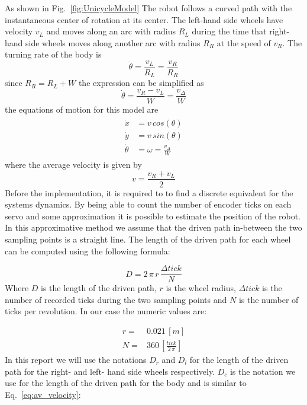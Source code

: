 As shown in Fig.~\ref{fig:UnicycleModel} The robot follows a curved path with the instantaneous center of rotation at its center.
The left-hand side wheels have velocity $v_L$ and moves along an arc with radius $R_L$ during the time that right-hand side wheels moves along another arc with radius $R_R$ at the speed of $v_R$.
The turning rate of the body is
\begin{equation*}
\dot{\theta}= \frac{v_L}{R_L} = \frac{v_R}{R_R}
\end{equation*}
since $R_R = R_L + W$ the expression can be simplified as
\begin{equation}
\dot{\theta}= \frac{v_R - v_L}{W} = \frac{v_\Delta}{W}\label{eq:ThetaDot}
\end{equation}
the equations of motion for this model are
\begin{eqnarray}
\begin{aligned}
\dot{x} &= v\,cos(\theta)\\
\dot{y} &= v\,sin(\theta)\\
\dot{\theta} &= \omega = \frac{v_\Delta}{W}
\end{aligned}
\label{eq:MotionEq}
\end{eqnarray}
where the average velocity \parencite{Corke2011} is given by
\begin{equation}
v = \frac{v_R + v_L}{2}
\label{eq:av_velocity}
\end{equation}
Before the implementation, it is required to to find a discrete equivalent for the systems dynamics.
By being able to count the number of encoder ticks on each servo and some approximation it is possible to estimate the position of the robot.
In this approximative method we assume that the driven path in-between the two sampling points is a straight line. 
The length of the driven path for each wheel can be computed using the following formula:

\begin{equation}
    D = 2\,\pi\,r\,\frac{\Delta tick}{N}
\end{equation}\label{eq:encoder-formula}
Where $D$ is the length of the driven path, $r$ is the wheel radius, $\Delta tick$ is the number of recorded ticks during the two sampling points and $N$ is the number of ticks per revolution.
In our case the numeric values are:

\begin{eqnarray*}
    r =& 0.021\, [m]\\
    N =& 360\, [\frac{tick}{2\,\pi}]
\end{eqnarray*}
In this report we will use the notations $D_r$ and $D_l$ for the length of the driven path for the right- and left- hand side wheels respectively. 
$D_c$ is the notation we use for the length of the driven path for the body and is similar to Eq.~\eqref{eq:av_velocity}:

